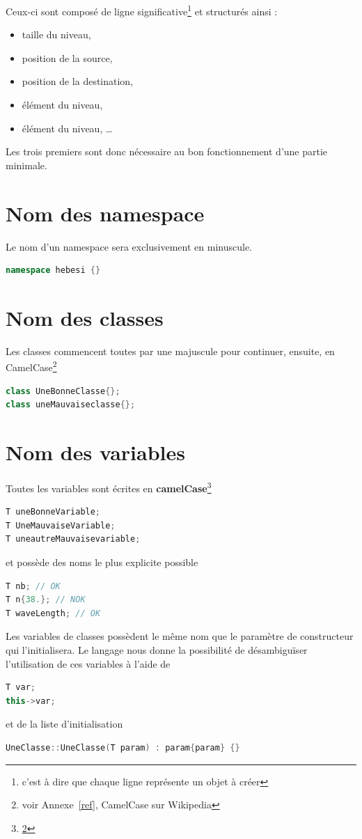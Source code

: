 \documentclass[a4paper,11pt]{report}
\begin{document}
Ceux-ci sont composé de ligne significative\footnote{c'est à dire que chaque
ligne représente un objet à créer} et structurés ainsi :
\begin{itemize}
	\item taille du niveau,
	\item position de la source,
	\item position de la destination,
	\item élément du niveau,
	\item élément du niveau, \dots
\end{itemize}
Les trois premiers sont donc nécessaire au bon fonctionnement d'une partie
minimale.
\section{Nom des namespace}
Le nom d'un namespace sera exclusivement en minuscule.
\begin{lstlisting}[frame=single, language=C++]
namespace hebesi {}
\end{lstlisting}
\section{Nom des classes}
Les classes commencent toutes par une majuscule pour continuer, ensuite, en
CamelCase\footnote{\label{cc}voir Annexe~\ref{ref}, CamelCase sur Wikipedia}
\begin{lstlisting}[frame=single,language=C++]
class UneBonneClasse{};
class uneMauvaiseclasse{};
\end{lstlisting}
\section{Nom des variables}
Toutes les variables sont écrites en
\textbf{camelCase}\footnote{\ref{cc}}
\begin{lstlisting}[frame=single,language=C++]
T uneBonneVariable;
T UneMauvaiseVariable;
T uneautreMauvaisevariable;
\end{lstlisting}
et possède des noms le plus explicite possible
\begin{lstlisting}[frame=single,language=C++]
T nb; // OK
T n{38.}; // NOK
T waveLength; // OK
\end{lstlisting}
Les variables de classes possèdent le même nom que le paramètre de constructeur
qui l'initialisera. Le langage nous donne la possibilité de désambiguïser
l'utilisation de ces variables à l'aide de 
\begin{lstlisting}[frame=single,language=C++]
T var;
this->var;
\end{lstlisting}
et de la liste d'initialisation
\begin{lstlisting}[frame=single,language=C++]
UneClasse::UneClasse(T param) : param{param} {}
\end{lstlisting}
\end{document}
